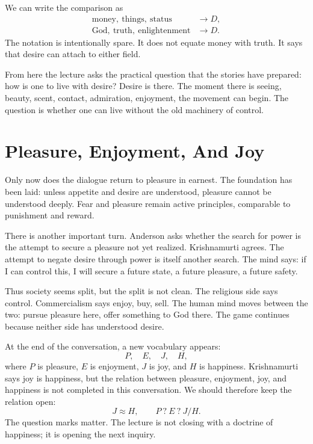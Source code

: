We can write the comparison as
\begin{align}
\mathrm{money,\ things,\ status} &\longrightarrow D,\\
\mathrm{God,\ truth,\ enlightenment} &\longrightarrow D.
\end{align}
The notation is intentionally spare. It does not equate money with truth. It says that desire can attach to either field.

From here the lecture asks the practical question that the stories have prepared: how is one to live with desire? Desire is there. The moment there is seeing, beauty, scent, contact, admiration, enjoyment, the movement can begin. The question is whether one can live without the old machinery of control.

\section{Pleasure, Enjoyment, And Joy}

Only now does the dialogue return to pleasure in earnest. The foundation has been laid: unless appetite and desire are understood, pleasure cannot be understood deeply. Fear and pleasure remain active principles, comparable to punishment and reward.

There is another important turn. Anderson asks whether the search for power is the attempt to secure a pleasure not yet realized. Krishnamurti agrees. The attempt to negate desire through power is itself another search. The mind says: if I can control this, I will secure a future state, a future pleasure, a future safety.

Thus society seems split, but the split is not clean. The religious side says control. Commercialism says enjoy, buy, sell. The human mind moves between the two: pursue pleasure here, offer something to God there. The game continues because neither side has understood desire.

At the end of the conversation, a new vocabulary appears:
\begin{equation}
P,\quad E,\quad J,\quad H,
\end{equation}
where \(P\) is pleasure, \(E\) is enjoyment, \(J\) is joy, and \(H\) is happiness. Krishnamurti says joy is happiness, but the relation between pleasure, enjoyment, joy, and happiness is not completed in this conversation. We should therefore keep the relation open:
\begin{equation}
J \approx H,
\qquad
P \ ? \ E \ ? \ J/H.
\end{equation}
The question marks matter. The lecture is not closing with a doctrine of happiness; it is opening the next inquiry.

